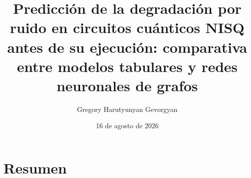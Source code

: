 \documentclass[11pt,a4paper,spanish]{book}
\title{Predicción de la\newline
degradación por ruido en\newline
circuitos cuánticos NISQ\newline
antes de su ejecución:\newline
comparativa entre modelos\newline
tabulares y redes\newline
neuronales de grafos}
\author{Gregory Harutyunyan Gevorgyan}
\date{16 de agosto de 2026}
\begin{document}
\renewcommand{\listfigurename}{Índice de Ilustraciones}
\renewcommand{\listtablename}{Índice de Tablas}
\renewcommand{\contentsname}{Índice de Contenidos}
\renewcommand{\figurename}{Figura}
\renewcommand{\tablename}{Tabla}

\begingroup
{}  \raggedright
\maketitle
\endgroup

\makeatletter
\@mainmatterfalse
\makeatother
{}

\chapter{Resumen}
%
\end{document}
